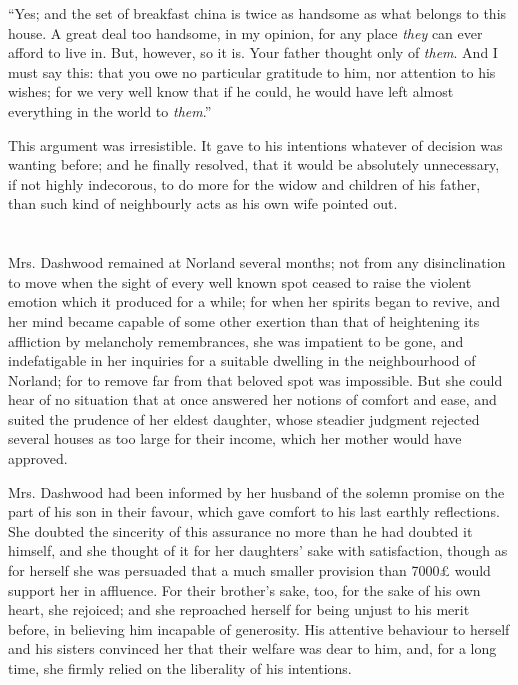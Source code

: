 “Yes; and the set of breakfast china is twice as handsome as what belongs to this house. A great deal too handsome, in my opinion, for any place {\em they} can ever afford to live in. But, however, so it is. Your father thought only of {\em them}. And I must say this: that you owe no particular gratitude to him, nor attention to his wishes; for we very well know that if he could, he would have left almost everything in the world to {\em them}.”

This argument was irresistible. It gave to his intentions whatever of decision was wanting before; and he finally resolved, that it would be absolutely unnecessary, if not highly indecorous, to do more for the widow and children of his father, than such kind of neighbourly acts as his own wife pointed out.

\chapter{} %

Mrs. Dashwood remained at Norland several months; not from any disinclination to move when the sight of every well known spot ceased to raise the violent emotion which it produced for a while; for when her spirits began to revive, and her mind became capable of some other exertion than that of heightening its affliction by melancholy remembrances, she was impatient to be gone, and indefatigable in her inquiries for a suitable dwelling in the neighbourhood of Norland; for to remove far from that beloved spot was impossible. But she could hear of no situation that at once answered her notions of comfort and ease, and suited the prudence of her eldest daughter, whose steadier judgment rejected several houses as too large for their income, which her mother would have approved.

Mrs. Dashwood had been informed by her husband of the solemn promise on the part of his son in their favour, which gave comfort to his last earthly reflections. She doubted the sincerity of this assurance no more than he had doubted it himself, and she thought of it for her daughters' sake with satisfaction, though as for herself she was persuaded that a much smaller provision than 7000£ would support her in affluence. For their brother's sake, too, for the sake of his own heart, she rejoiced; and she reproached herself for being unjust to his merit before, in believing him incapable of generosity. His attentive behaviour to herself and his sisters convinced her that their welfare was dear to him, and, for a long time, she firmly relied on the liberality of his intentions.

